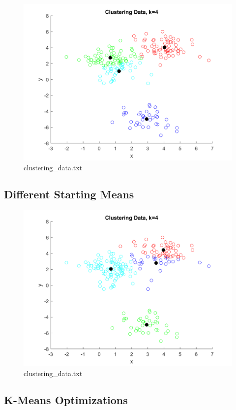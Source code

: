 \documentclass[12pt, letterpaper]{report}
\begin{document}
\begin{figure}[H]
	\centering
	\includegraphics[width=0.7\columnwidth]{cluster_k4_alpha.png}
	\caption{clustering\_data.txt}
\end{figure}


\subsection{Different Starting Means}


\begin{figure}[H]
	\centering
	\includegraphics[width=0.7\columnwidth]{cluster_k4_delta.png}
	\caption{clustering\_data.txt}
\end{figure}

\subsection{K-Means Optimizations}
\end{document}
